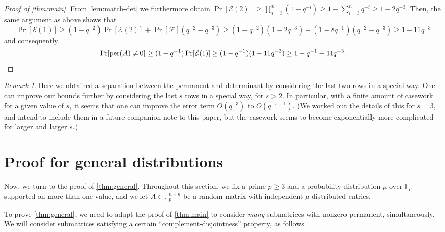 \documentclass[10pt,reqno]{amsart}
\numberwithin{equation}{section}
\theoremstyle{remark}
\newtheorem*{remark}{Remark}
\newcommand{\mb}{\mathbb}
\newcommand{\mc}{\mathcal}
\newcommand{\on}{\operatorname}
\begin{document}
\begin{proof}[Proof of \cref{thm:main}]
From \cref{lem:match-det} we furthermore obtain $\Pr[\mathcal{E}(2)]\ge \prod_{i=3}^{n}(1-q^{-i})\ge 1-\sum_{i=3}^{n}q^{-i}\ge 1-2q^{-3}$. Then, the same argument as above shows that
\[\Pr[\mathcal{E}(1)]\ge (1-q^{-2})\Pr[\mathcal{E}(2)]+\Pr[\mathcal{F}](q^{-2}-q^{-3})\ge (1-q^{-2})(1-2q^{-3})+(1-8q^{-1})(q^{-2}-q^{-3})\ge 1-11q^{-3}\]
and consequently
\[\Pr[\on{per}(A)\ne0]\ge (1-q^{-1})\Pr[\mc E(1)]\ge (1-q^{-1})(1-11q^{-3})\ge 1-q^{-1}-11q^{-3}.\qedhere\]
\end{proof}

\begin{remark}
    Here we obtained a separation between the permanent and determinant by considering the last two rows in a special way. One can improve our bounds further by considering the last $s$ rows in a special way, for $s>2$. In particular, with a finite amount of casework for a given value of $s$, it seems that one can improve the error term $O(q^{-3})$ to $O(q^{-s-1})$. (We worked out the details of this for $s=3$, and intend to include them in a future companion note to this paper, but the casework seems to become exponentially more complicated for larger and larger $s$.)%
\end{remark}

\section{Proof for general distributions}\label{sec:general}
Now, we turn to the proof of \cref{thm:general}. Throughout this section, we fix a prime $p\ge 3$ and a probability distribution $\mu$ over $\mb F_p$ supported on more than one value, and we let $A\in\mathbb{F}_{p}^{n\times n}$ be a random matrix with independent $\mu$-distributed entries.

To prove \cref{thm:general}, we need to adapt the proof of \cref{thm:main} to consider \emph{many} submatrices with nonzero permanent, simultaneously. We will consider submatrices satisfying a certain ``complement-disjointness'' property, as follows. %
\end{document}
